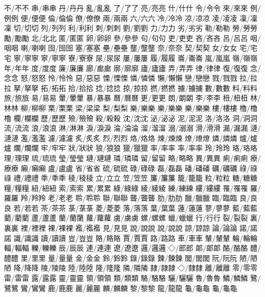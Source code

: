 不/不︀不 串/串︀串 丹/丹︀丹 亂/亂︀亂 了/了︀了 亮/亮︀亮 什/什︀什 令/令︀令 來/來︀來 例/例︀例 %
便/便︀便 倫/倫︀倫 僚/僚︀僚 兩/兩︀兩 六/六︀六 冷/冷︀冷 凉/凉︀凉 凌/凌︀凌 凜/凜︀凜 切/切︀切 %
列/列︀列 利/利︀利 刺/刺︀刺 劉/劉︀劉 力/力︀力 劣/劣︀劣 勒/勒︀勒 勞/勞︀勞 勵/勵︀勵 北/北︀北 %
匿/匿︀匿 卵/卵︀卵 參/參︀參 句/句︀句 吏/吏︀吏 吝/吝︀吝 呂/呂︀呂 咽/咽︀咽 喇/喇︀喇 囹/囹︀囹 %
塞/塞︀塞 壘/壘︀壘 壟/壟︀壟 奈/奈︀奈 契/契︀契 女/女︀女 宅/宅︀宅 寧/寧︀寧 寧/寧︁寧 寮/寮︀寮 %
尿/尿︀尿 屢/屢︀屢 履/履︀履 崙/崙︀崙 嵐/嵐︀嵐 嶺/嶺︀嶺 年/年︀年 度/度︀度 廉/廉︀廉 廊/廊︀廊 %
廓/廓︀廓 廬/廬︀廬 弄/弄︀弄 律/律︀律 復/復︀復 念/念︀念 怒/怒︀怒 怜/怜︀怜 惡/惡︀惡 慄/慄︀慄 %
憐/憐︀憐 懶/懶︀懶 戀/戀︀戀 戮/戮︀戮 拉/拉︀拉 拏/拏︀拏 拓/拓︀拓 拾/拾︀拾 捻/捻︀捻 掠/掠︀掠 %
撚/撚︀撚 擄/擄︀擄 數/數︀數 料/料︀料 旅/旅︀旅 易/易︀易 暈/暈︀暈 暴/暴︀暴 曆/曆︀曆 更/更︀更 %
朗/朗︀朗 李/李︀李 杻/杻︀杻 林/林︀林 柳/柳︀柳 栗/栗︀栗 梁/梁︀梁 梨/梨︀梨 樂/樂︀樂 樂/樂︁樂 %
樂/樂︂樂 樓/樓︀樓 櫓/櫓︀櫓 欄/欄︀欄 歷/歷︀歷 殮/殮︀殮 殺/殺︀殺 沈/沈︀沈 泌/泌︀泌 泥/泥︀泥 %
洛/洛︀洛 洞/洞︀洞 流/流︀流 浪/浪︀浪 淋/淋︀淋 淚/淚︀淚 淪/淪︀淪 溜/溜︀溜 溺/溺︀溺 滑/滑︀滑 %
漏/漏︀漏 漣/漣︀漣 濫/濫︀濫 濾/濾︀濾 炙/炙︀炙 烈/烈︀烈 烙/烙︀烙 煉/煉︀煉 燎/燎︀燎 燐/燐︀燐 %
爐/爐︀爐 爛/爛︀爛 牢/牢︀牢 狀/狀︀狀 狼/狼︀狼 獵/獵︀獵 率/率︀率 率/率︁率 玲/玲︀玲 珞/珞︀珞 %
理/理︀理 琉/琉︀琉 瑩/瑩︀瑩 璉/璉︀璉 璘/璘︀璘 留/留︀留 略/略︀略 異/異︀異 痢/痢︀痢 療/療︀療 %
癩/癩︀癩 盧/盧︀盧 省/省︀省 硫/硫︀硫 碌/碌︀碌 磊/磊︀磊 磻/磻︀磻 礪/礪︀礪 祿/祿︀祿 禮/禮︀禮 %
秊/秊︀秊 稜/稜︀稜 立/立︀立 笠/笠︀笠 簾/簾︀簾 籠/籠︀籠 粒/粒︀粒 糖/糖︀糖 糧/糧︀糧 紐/紐︀紐 %
索/索︀索 累/累︀累 綠/綠︀綠 綾/綾︀綾 練/練︀練 縷/縷︀縷 罹/罹︀罹 羅/羅︀羅 羚/羚︀羚 老/老︀老 %
聆/聆︀聆 聯/聯︀聯 聾/聾︀聾 肋/肋︀肋 臘/臘︀臘 臨/臨︀臨 良/良︀良 若/若︀若 茶/茶︀茶 菉/菉︀菉 %
菱/菱︀菱 落/落︀落 葉/葉︀葉 蓮/蓮︀蓮 蓼/蓼︀蓼 藍/藍︀藍 藺/藺︀藺 蘆/蘆︀蘆 蘭/蘭︀蘭 蘿/蘿︀蘿 %
虜/虜︀虜 螺/螺︀螺 蠟/蠟︀蠟 行/行︀行 裂/裂︀裂 裏/裏︀裏 裡/裡︀裡 裸/裸︀裸 襤/襤︀襤 見/見︀見 %
說/說︀說 說/說︁說 諒/諒︀諒 論/論︀論 諾/諾︀諾 識/識︀識 讀/讀︀讀 豈/豈︀豈 賂/賂︀賂 賈/賈︀賈 %
路/路︀路 車/車︀車 輦/輦︀輦 輪/輪︀輪 輻/輻︀輻 轢/轢︀轢 辰/辰︀辰 連/連︀連 遼/遼︀遼 邏/邏︀邏 %
◇/郎︀郎 郞/郞︀郞 酪/酪︀酪 醴/醴︀醴 里/里︀里 量/量︀量 金/金︀金 鈴/鈴︀鈴 錄/錄︀錄 鍊/鍊︀鍊 %
閭/閭︀閭 阮/阮︀阮 陋/陋︀陋 降/降︀降 陵/陵︀陵 陸/陸︀陸 隆/隆︀隆 隣/隣︀隣 隷/隷︀隷 ◇/隸︀隸 %
離/離︀離 零/零︀零 雷/雷︀雷 露/露︀露 靈/靈︀靈 領/領︀領 類/類︀類 駱/駱︀駱 驪/驪︀驪 魯/魯︀魯 %
鱗/鱗︀鱗 鷺/鷺︀鷺 鸞/鸞︀鸞 鹿/鹿︀鹿 麗/麗︀麗 麟/麟︀麟 黎/黎︀黎 龍/龍︀龍 龜/龜︀龜 龜/龜︁龜 %
